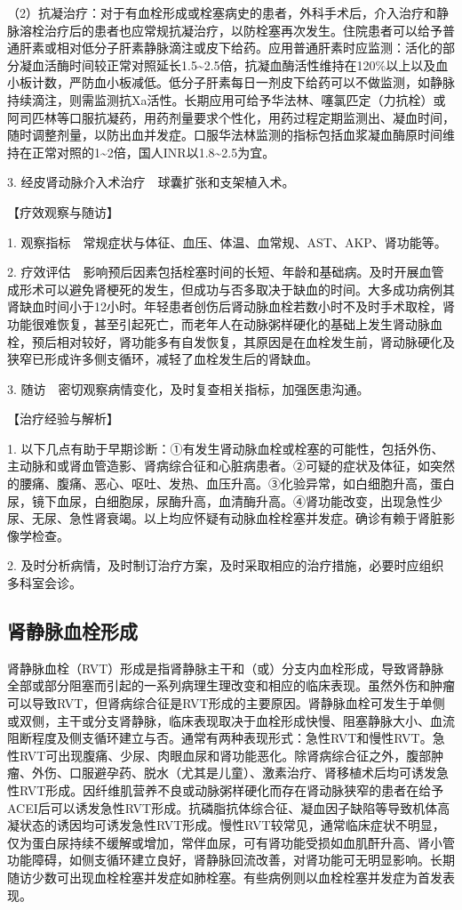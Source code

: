 （2）抗凝治疗：对于有血栓形成或栓塞病史的患者，外科手术后，介入治疗和静脉溶栓治疗后的患者也应常规抗凝治疗，以防栓塞再次发生。住院患者可以给予普通肝素或相对低分子肝素静脉滴注或皮下给药。应用普通肝素时应监测：活化的部分凝血活酶时间较正常对照延长1.5\textasciitilde{}2.5倍，抗凝血酶活性维持在120\%以上以及血小板计数，严防血小板减低。低分子肝素每日一剂皮下给药可以不做监测，如静脉持续滴注，则需监测抗Xa活性。长期应用可给予华法林、噻氯匹定（力抗栓）或阿司匹林等口服抗凝药，用药剂量要求个性化，用药过程定期监测出、凝血时间，随时调整剂量，以防出血并发症。口服华法林监测的指标包括血浆凝血酶原时间维持在正常对照的1\textasciitilde{}2倍，国人INR以1.8\textasciitilde{}2.5为宜。

3. 经皮肾动脉介入术治疗　球囊扩张和支架植入术。

【疗效观察与随访】

1. 观察指标　常规症状与体征、血压、体温、血常规、AST、AKP、肾功能等。

2.
疗效评估　影响预后因素包括栓塞时间的长短、年龄和基础病。及时开展血管成形术可以避免肾梗死的发生，但成功与否多取决于缺血的时间。大多成功病例其肾缺血时间小于12小时。年轻患者创伤后肾动脉血栓若数小时不及时手术取栓，肾功能很难恢复，甚至引起死亡，而老年人在动脉粥样硬化的基础上发生肾动脉血栓，预后相对较好，肾功能多有自发恢复，其原因是在血栓发生前，肾动脉硬化及狭窄已形成许多侧支循环，减轻了血栓发生后的肾缺血。

3. 随访　密切观察病情变化，及时复查相关指标，加强医患沟通。

【治疗经验与解析】

1.
以下几点有助于早期诊断：①有发生肾动脉血栓或栓塞的可能性，包括外伤、主动脉和或肾血管造影、肾病综合征和心脏病患者。②可疑的症状及体征，如突然的腰痛、腹痛、恶心、呕吐、发热、血压升高。③化验异常，如白细胞升高，蛋白尿，镜下血尿，白细胞尿，尿酶升高，血清酶升高。④肾功能改变，出现急性少尿、无尿、急性肾衰竭。以上均应怀疑有动脉血栓栓塞并发症。确诊有赖于肾脏影像学检查。

2.
及时分析病情，及时制订治疗方案，及时采取相应的治疗措施，必要时应组织多科室会诊。

\subsection{肾静脉血栓形成}

肾静脉血栓（RVT）形成是指肾静脉主干和（或）分支内血栓形成，导致肾静脉全部或部分阻塞而引起的一系列病理生理改变和相应的临床表现。虽然外伤和肿瘤可以导致RVT，但肾病综合征是RVT形成的主要原因。肾静脉血栓可发生于单侧或双侧，主干或分支肾静脉，临床表现取决于血栓形成快慢、阻塞静脉大小、血流阻断程度及侧支循环建立与否。通常有两种表现形式：急性RVT和慢性RVT。急性RVT可出现腹痛、少尿、肉眼血尿和肾功能恶化。除肾病综合征之外，腹部肿瘤、外伤、口服避孕药、脱水（尤其是儿童）、激素治疗、肾移植术后均可诱发急性RVT形成。因纤维肌营养不良或动脉粥样硬化而存在肾动脉狭窄的患者在给予ACEI后可以诱发急性RVT形成。抗磷脂抗体综合征、凝血因子缺陷等导致机体高凝状态的诱因均可诱发急性RVT形成。慢性RVT较常见，通常临床症状不明显，仅为蛋白尿持续不缓解或增加，常伴血尿，可有肾功能受损如血肌酐升高、肾小管功能障碍，如侧支循环建立良好，肾静脉回流改善，对肾功能可无明显影响。长期随访少数可出现血栓栓塞并发症如肺栓塞。有些病例则以血栓栓塞并发症为首发表现。


